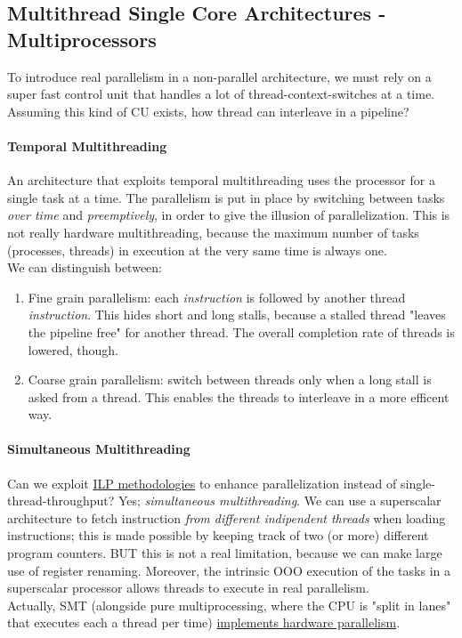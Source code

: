 \documentclass[10pt,a4paper]{article}
\begin{document}
			\subsection{Multithread Single Core Architectures - Multiprocessors}
				To introduce real parallelism in a non-parallel architecture, we must rely on a super fast control unit that handles a lot of thread-context-switches at a time. Assuming this kind of CU exists, how thread can interleave in a pipeline? 
				
				\paragraph{Temporal Multithreading}
					An architecture that exploits temporal multithreading uses the processor for a single task at a time. The parallelism is put in place by switching between tasks \emph{over time} and \emph{preemptively}, in order to give the illusion of parallelization. This is not really hardware multithreading, because the maximum number of tasks (processes, threads) in execution at the very same time is always one.\\
					We can distinguish between:
					\begin{enumerate}
						\item Fine grain parallelism: each \emph{instruction} is followed by another thread \emph{instruction}. This hides short and long stalls, because a stalled thread "leaves the pipeline free" for another thread. The overall completion rate of threads is lowered, though.
						\item Coarse grain parallelism: switch between threads only when a long stall is asked from a thread. This enables the threads to interleave in a more efficent way. 
					\end{enumerate}
				
				\paragraph{Simultaneous Multithreading}
					Can we exploit \underline{ILP methodologies} to enhance parallelization instead of single-thread-throughput? Yes; \emph{simultaneous multithreading}. We can use a superscalar architecture to fetch instruction \emph{from different indipendent threads} when loading instructions; this is made possible by keeping track of two (or more) different program counters. BUT this is not a real limitation, because we can make large use of register renaming. Moreover, the intrinsic OOO execution of the tasks in a superscalar processor allows threads to execute in real parallelism.\\
					Actually, SMT (alongside pure multiprocessing, where the CPU is "split in lanes" that executes each a thread per time) \underline{implements hardware parallelism}.
					
\end{document}
